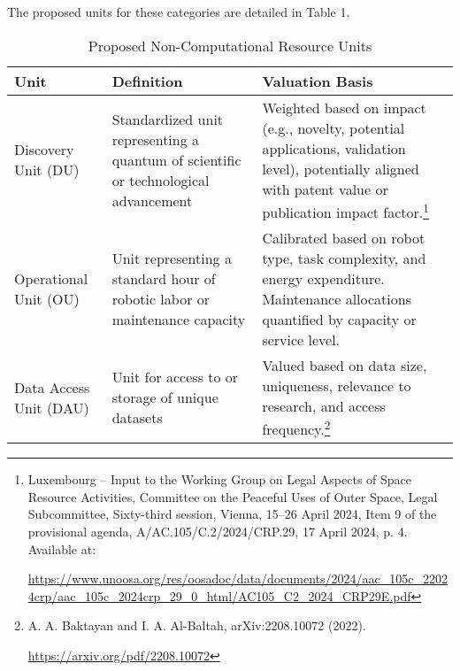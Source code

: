 \documentclass[fontsize=10pt, oneside, DIV=calc]{scrartcl}
\begin{document}
\medskip

\noindent
The proposed units for these categories are detailed in Table 1.

\begin{table}[htbp]
\centering
\caption{Proposed Non-Computational Resource Units}
\begin{tabularx}{\textwidth}{|X|X|X|}
  \hline
  \textbf{Unit} & \textbf{Definition} & \textbf{Valuation Basis} \\ \hline
  Discovery Unit (DU) & Standardized unit representing a quantum of scientific or technological advancement & Weighted based on impact (e.g., novelty, potential applications, validation level), potentially aligned with patent value or publication impact factor.\footnote{Luxembourg – Input to the Working Group on Legal Aspects of Space Resource Activities, Committee on the Peaceful Uses of Outer Space, Legal Subcommittee, Sixty-third session, Vienna, 15–26 April 2024, Item 9 of the provisional agenda, A/AC.105/C.2/2024/CRP.29, 17 April 2024, p. 4. Available at: 











\href{https://www.unoosa.org/res/oosadoc/data/documents/2024/aac\_105c\_22024crp/aac\_105c\_2024crp\_29\_0\_html/AC105\_C2\_2024\_CRP29E.pdf}\url{https://www.unoosa.org/res/oosadoc/data/documents/2024/aac\_105c\_22024crp/aac\_105c\_2024crp\_29\_0\_html/AC105\_C2\_2024\_CRP29E.pdf}}\\ \hline
  Operational Unit (OU) & Unit representing a standard hour of robotic labor or maintenance capacity & Calibrated based on robot type, task complexity, and energy expenditure. Maintenance allocations quantified by capacity or service level.\\ \hline
  Data Access Unit (DAU) & Unit for access to or storage of unique datasets & Valued based on data size, uniqueness, relevance to research, and access frequency.\footnote{A. A. Baktayan and I. A. Al-Baltah, arXiv:2208.10072 (2022). 











\href{https://arxiv.org/pdf/2208.10072}\url{https://arxiv.org/pdf/2208.10072}}\\ \hline
\end{tabularx}
\end{table}
\end{document}
